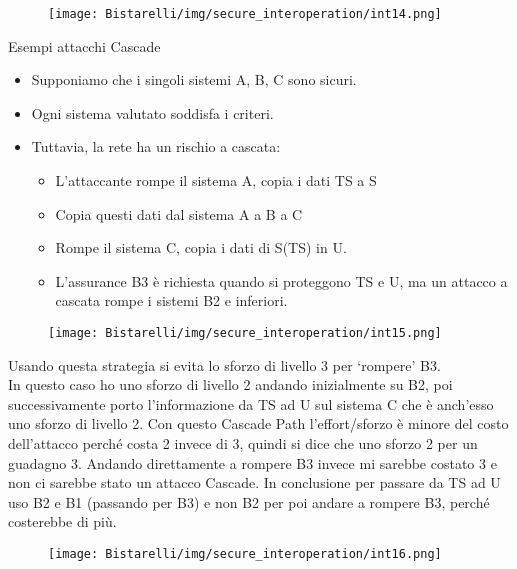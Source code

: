 \begin{figure}[H]
	\centering
    \texttt{[image: Bistarelli/img/secure\_interoperation/int14.png]}
\end{figure}

Esempi attacchi Cascade

\begin{itemize}
    \item Supponiamo che i singoli sistemi A, B, C sono sicuri.
    
    \item Ogni sistema valutato soddisfa i criteri.
    
    \item  Tuttavia, la rete ha un rischio a cascata:
    
    \begin{itemize}
        \item L'attaccante rompe il sistema A, copia i dati TS a S
        
        \item Copia questi dati dal sistema A a B a C
        
        \item Rompe il sistema C, copia i dati di S(TS) in U.
        
        \item L’assurance B3 è richiesta quando si proteggono TS e U, ma un attacco a cascata rompe i sistemi B2 e inferiori.
    \end{itemize}
\end{itemize}

\begin{figure}[H]
	\centering
    \texttt{[image: Bistarelli/img/secure\_interoperation/int15.png]}
\end{figure}

Usando questa strategia si evita lo sforzo di livello 3 per ‘rompere’ B3.
\\
In questo caso ho uno sforzo di livello 2 andando inizialmente su B2, poi successivamente porto l’informazione
da TS ad U sul sistema C che è anch’esso uno sforzo di livello 2. Con questo Cascade Path l’effort/sforzo è
minore del costo dell’attacco perché costa 2 invece di 3, quindi si dice che uno sforzo 2 per un
guadagno 3. Andando direttamente a rompere B3 invece mi sarebbe costato 3 e non ci sarebbe stato un attacco
Cascade. In conclusione per passare da TS ad U uso B2 e B1 (passando per B3) e non B2 per poi andare a
rompere B3, perché costerebbe di più.

\begin{figure}[H]
	\centering
    \texttt{[image: Bistarelli/img/secure\_interoperation/int16.png]}
\end{figure}
